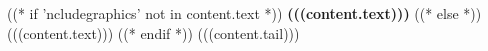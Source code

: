 ((* if 'ncludegraphics' not in content.text *))
\textbf{(((content.text)))} 
((* else *))
(((content.text)))
((* endif *))
(((content.tail)))
